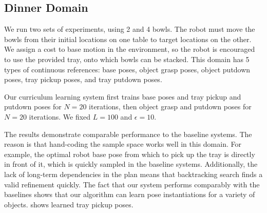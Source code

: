 \subsection{Dinner Domain}
We run two sets of experiments, using 2 and 4 bowls. The robot must move the
bowls from their initial locations on one table to target locations on the other. We assign a cost to
base motion in the environment, so the robot is encouraged to use the provided tray, onto which bowls can be stacked.
This domain has 5 types of continuous references: base poses, object grasp poses, object putdown poses, tray pickup
poses, and tray putdown poses.

Our curriculum learning system first trains base poses and tray pickup and putdown poses for
$N = 20$ iterations, then object grasp and putdown poses for $N = 20$ iterations. We fixed $L = 100$ and $\epsilon = 10$.

The results demonstrate comparable performance to the baseline systems. The reason is that
hand-coding the sample space works well in this domain. For example, the optimal
robot base pose from which to pick up the tray is directly in front of it, which is quickly sampled in
the baseline systems. Additionally, the lack of long-term dependencies in the plan
means that backtracking search finds a valid refinement quickly. The fact that our system performs comparably
with the baselines shows that our algorithm can learn pose instantiations for a variety of objects.
 shows learned tray pickup poses.

